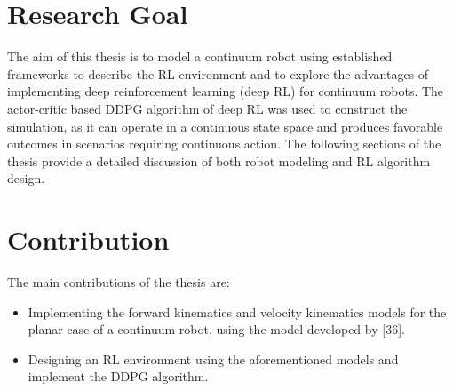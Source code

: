 \documentclass[12pt,twoside,a4]{mwbk}
\begin{document}
\section{Research Goal}
The aim of this thesis is to model a continuum robot using established frameworks to describe the RL environment and to explore the advantages of implementing deep reinforcement learning (deep RL) for continuum robots. The actor-critic based DDPG algorithm of deep RL was used to construct the simulation, as it can operate in a continuous state space and produces favorable outcomes in scenarios requiring continuous action. The following sections of the thesis provide a detailed discussion of both robot modeling and RL algorithm design.
\section{Contribution}
The main contributions of the thesis are:
\begin{itemize}
    \item Implementing the forward kinematics and velocity kinematics models for the planar case of a continuum robot, using the model developed by [36].
    \item Designing an RL environment using the aforementioned models and implement the DDPG algorithm.
\end{itemize}
\end{document}
